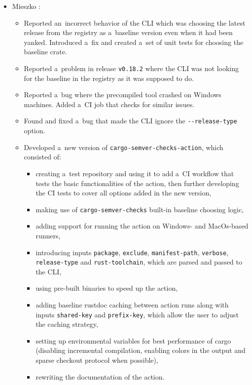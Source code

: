 \documentclass[licencjacka,en]{pracamgr}
\begin{document}
\begin{itemize}
	\item Mieszko \cite{responsibilities-mieszko}:
		\begin{itemize}
			\item Reported an~incorrect behavior of the CLI which was choosing the latest release
				from the registry as a~baseline version even when it had been yanked.
				Introduced a~fix and created a~set of unit tests for choosing the baseline crate.
			\item Reported a~problem in release \texttt{v0.18.2} where the CLI was not looking for
				the baseline in the registry as it was supposed to do.
			\item Reported a~bug where the precompiled tool crashed on Windows machines.
				Added a~CI job that checks for similar issues.
			\item Found and fixed a~bug that made the CLI ignore the \texttt{-{}-release-type} option.
			\item Developed a~new version of \texttt{cargo-semver-checks-action}, which consisted of:
			\begin{itemize}
				\item creating a~test repository \cite{responsibilities-mieszko-action-tests}
					and using it to add a~CI workflow that tests the basic functionalities of
					the action, then further developing the CI tests to cover all options added in
					the new version,
				\item making use of \texttt{cargo-semver-checks} built-in baseline choosing logic,
				\item adding support for running the action on Windows- and MacOs-based runners,
				\item introducing inputs \texttt{package}, \texttt{exclude}, \texttt{manifest-path},
					\texttt{verbose}, \texttt{release-type} and \texttt{rust-toolchain},
					which are parsed and passed to the CLI,
				\item using pre-built binaries to speed up the action,
				\item adding baseline rustdoc caching between action runs along with
					inputs \texttt{shared-key} and \texttt{prefix-key}, which allow the user
					to adjust the caching strategy,
				\item setting up environmental variables for best performance of cargo (disabling
					incremental compilation, enabling colors in the output and sparse
					checkout protocol when possible),
				\item rewriting the documentation of the action.
			\end{itemize}
		\end{itemize}


\end{itemize}
\end{document}
